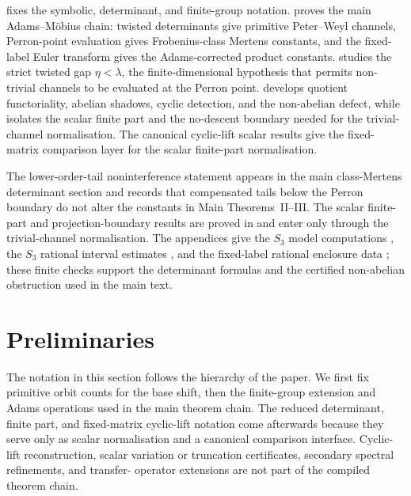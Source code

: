 \documentclass[11pt,a4paper]{amsart}
\theoremstyle{plain}
\theoremstyle{definition}
\theoremstyle{remark}
\begin{document}
 fixes the symbolic, determinant, and finite-group
notation.   proves the main Adams--M\"obius chain: twisted
determinants give primitive Peter--Weyl channels, Perron-point evaluation gives
Frobenius-class Mertens constants, and the fixed-label Euler transform gives
the Adams-corrected product constants.   studies the strict
twisted gap \(\eta<\lambda\), the finite-dimensional hypothesis that permits
non-trivial channels to be evaluated at the Perron point.  
develops quotient functoriality, abelian shadows, cyclic detection, and the
non-abelian defect, while  isolates the scalar finite
part and the no-descent boundary needed for the trivial-channel normalisation.
The canonical cyclic-lift scalar results give the fixed-matrix comparison layer
for the scalar finite-part normalisation.

The lower-order-tail noninterference statement
 appears in the main
class-Mertens determinant section and records that compensated tails below the
Perron boundary do not alter the constants in Main Theorems~II--III.  The scalar
finite-part and projection-boundary results are proved in 
and enter only through the trivial-channel normalisation.  The appendices give
the \(S_3\) model computations , the \(S_3\)
rational interval estimates , and the fixed-label
rational enclosure data ; these
finite checks support the determinant formulas and the certified non-abelian
obstruction used in the main text.







\section{Preliminaries}\label{sec:preliminaries}

The notation in this section follows the hierarchy of the paper. We
first fix primitive orbit counts for the base shift, then the
finite-group extension and Adams operations used in the main theorem
chain. The reduced determinant, finite part, and fixed-matrix cyclic-lift
notation come afterwards because they serve only as scalar normalisation and a
canonical comparison interface.  Cyclic-lift reconstruction, scalar variation
or truncation certificates, secondary spectral refinements, and transfer-
operator extensions are not part of the compiled theorem chain.
\end{document}

